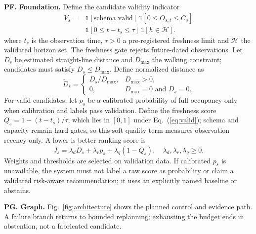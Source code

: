 \documentclass[conference,letterpaper,10pt]{IEEEtran}
\begin{document}
\noindent\textbf{PF. Foundation.} Define the candidate validity indicator
\begin{equation}
\begin{aligned}
V_s={}&\mathbb{1}[\text{schema valid}]\,\mathbb{1}[0\leq O_{s,t}\leq C_s]\\
&\mathbb{1}[0\leq t-t_s\leq\tau]\,\mathbb{1}[h\in\mathcal{H}].
\end{aligned}
\label{eq:valid}
\end{equation}
where $t_s$ is the observation time, $\tau>0$ a pre-registered freshness limit and $\mathcal{H}$ the validated horizon set. The freshness gate rejects future-dated observations. Let $D_s$ be estimated straight-line distance and $D_{\max}$ the walking constraint; candidates must satisfy $D_s\leq D_{\max}$. Define normalized distance as
\begin{equation}
\widetilde{D}_s=\begin{cases}
D_s/D_{\max}, & D_{\max}>0,\\
0, & D_{\max}=0\text{ and }D_s=0.
\end{cases}
\label{eq:distance}
\end{equation}
For valid candidates, let $p_s$ be a calibrated probability of full occupancy only when calibration and labels pass validation. Define the freshness score $Q_s=1-(t-t_s)/\tau$, which lies in $[0,1]$ under Eq.~(\ref{eq:valid}); schema and capacity remain hard gates, so this soft quality term measures observation recency only. A lower-is-better ranking score is
\begin{equation}
J_s=\lambda_d\widetilde{D}_s+\lambda_r p_s+\lambda_q(1-Q_s),\quad \lambda_d,\lambda_r,\lambda_q\geq 0.
\label{eq:rank}
\end{equation}
Weights and thresholds are selected on validation data. If calibrated $p_s$ is unavailable, the system must not label a raw score as probability or claim a validated risk-aware recommendation; it uses an explicitly named baseline or abstains.

\noindent\textbf{PG. Graph.} Fig.~\ref{fig:architecture} shows the planned control and evidence path. A failure branch returns to bounded replanning; exhausting the budget ends in abstention, not a fabricated candidate.
\end{document}
